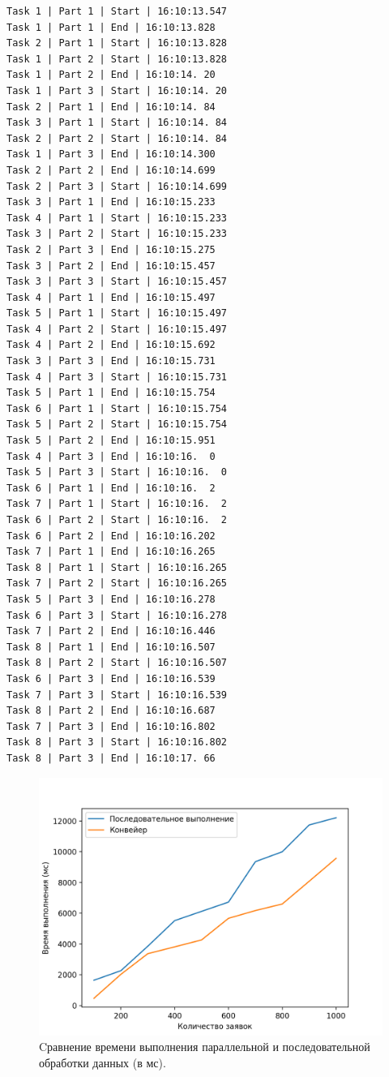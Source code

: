 \documentclass[12pt]{report}
\begin{document}
\begin{lstlisting}[label=queueTasks,caption=Лог параллельной обработки восьми заявок]
Task 1 | Part 1 | Start | 16:10:13.547
Task 1 | Part 1 | End | 16:10:13.828
Task 2 | Part 1 | Start | 16:10:13.828
Task 1 | Part 2 | Start | 16:10:13.828
Task 1 | Part 2 | End | 16:10:14. 20
Task 1 | Part 3 | Start | 16:10:14. 20
Task 2 | Part 1 | End | 16:10:14. 84
Task 3 | Part 1 | Start | 16:10:14. 84
Task 2 | Part 2 | Start | 16:10:14. 84
Task 1 | Part 3 | End | 16:10:14.300
Task 2 | Part 2 | End | 16:10:14.699
Task 2 | Part 3 | Start | 16:10:14.699
Task 3 | Part 1 | End | 16:10:15.233
Task 4 | Part 1 | Start | 16:10:15.233
Task 3 | Part 2 | Start | 16:10:15.233
Task 2 | Part 3 | End | 16:10:15.275
Task 3 | Part 2 | End | 16:10:15.457
Task 3 | Part 3 | Start | 16:10:15.457
Task 4 | Part 1 | End | 16:10:15.497
Task 5 | Part 1 | Start | 16:10:15.497
Task 4 | Part 2 | Start | 16:10:15.497
Task 4 | Part 2 | End | 16:10:15.692
Task 3 | Part 3 | End | 16:10:15.731
Task 4 | Part 3 | Start | 16:10:15.731
Task 5 | Part 1 | End | 16:10:15.754
Task 6 | Part 1 | Start | 16:10:15.754
Task 5 | Part 2 | Start | 16:10:15.754
Task 5 | Part 2 | End | 16:10:15.951
Task 4 | Part 3 | End | 16:10:16.  0
Task 5 | Part 3 | Start | 16:10:16.  0
Task 6 | Part 1 | End | 16:10:16.  2
Task 7 | Part 1 | Start | 16:10:16.  2
Task 6 | Part 2 | Start | 16:10:16.  2
Task 6 | Part 2 | End | 16:10:16.202
Task 7 | Part 1 | End | 16:10:16.265
Task 8 | Part 1 | Start | 16:10:16.265
Task 7 | Part 2 | Start | 16:10:16.265
Task 5 | Part 3 | End | 16:10:16.278
Task 6 | Part 3 | Start | 16:10:16.278
Task 7 | Part 2 | End | 16:10:16.446
Task 8 | Part 1 | End | 16:10:16.507
Task 8 | Part 2 | Start | 16:10:16.507
Task 6 | Part 3 | End | 16:10:16.539
Task 7 | Part 3 | Start | 16:10:16.539
Task 8 | Part 2 | End | 16:10:16.687
Task 7 | Part 3 | End | 16:10:16.802
Task 8 | Part 3 | Start | 16:10:16.802
Task 8 | Part 3 | End | 16:10:17. 66
\end{lstlisting}
\newpage
\begin{figure}[h]
	\centering
	\includegraphics[width = \linewidth]{cmp.png}
	\caption{Cравнение времени выполнения параллельной и последовательной обработки данных (в мс).}
	\label{cmp}
\end{figure}
\end{document}

